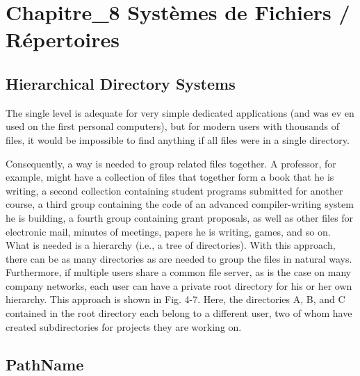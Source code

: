 











\newpage



\section{Chapitre\_8 Systèmes de Fichiers / Répertoires}

\subsection{Hierarchical Directory Systems}
The single level is adequate for very simple dedicated applications (and was
ev en used on the first personal computers), but for modern users with thousands of
files, it would be impossible to find anything if all files were in a single directory.


Consequently, a way is needed to group related files together. A professor, for example,
might have a collection of files that together form a book that he is writing,
a second collection containing student programs submitted for another course, a
third group containing the code of an advanced compiler-writing system he is
building, a fourth group containing grant proposals, as well as other files for electronic
mail, minutes of meetings, papers he is writing, games, and so on.
What is needed is a hierarchy (i.e., a tree of directories). With this approach,
there can be as many directories as are needed to group the files in natural ways.
Furthermore, if multiple users share a common file server, as is the case on many
company networks, each user can have a private root directory for his or her own
hierarchy. This approach is shown in Fig. 4-7. Here, the directories A, B, and C
contained in the root directory each belong to a different user, two of whom have
created subdirectories for projects they are working on.


\subsection{PathName}

